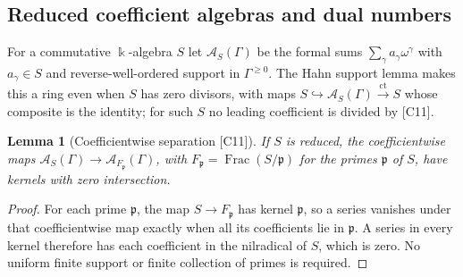 \documentclass[11pt,oneside]{article}
\numberwithin{equation}{section}
\newtheorem{lemma}[lemma]{Lemma}
\theoremstyle{definition}
\theoremstyle{remark}
\newcommand{\ct}{\operatorname{ct}}
\newcommand{\Frac}{\operatorname{Frac}}
\newcommand{\src}[1]{\textup{\textsf{\small[#1]}}}
\begin{document}
\subsection{Reduced coefficient algebras and dual numbers}\label{odg:cr:sub:reduced}

For a commutative $\Bbbk$-algebra $S$ let $\mathcal A_S(\Gamma)$ be the formal sums
$\sum_\gamma a_\gamma\omega^\gamma$ with $a_\gamma\in S$ and reverse-well-ordered support
in $\Gamma^{\ge0}$. The Hahn support lemma makes this a ring even when $S$ has zero
divisors, with maps $S\hookrightarrow\mathcal A_S(\Gamma)\xrightarrow{\ct}S$ whose
composite is the identity; for such $S$ no leading coefficient is divided by
\src{C11}.

\begin{lemma}[Coefficientwise separation \src{C11}]\label{odg:cr:lem:reducedinjective}
If $S$ is reduced, the coefficientwise maps
$\mathcal A_S(\Gamma)\to\mathcal A_{F_{\mathfrak p}}(\Gamma)$, with
$F_{\mathfrak p}=\Frac(S/\mathfrak p)$ for the primes $\mathfrak p$ of $S$, have kernels
with zero intersection.
\end{lemma}
\begin{proof}
For each prime $\mathfrak p$, the map $S\to F_{\mathfrak p}$ has kernel
$\mathfrak p$, so a series vanishes under that coefficientwise map exactly
when all its coefficients lie in $\mathfrak p$. A series in every kernel
therefore has each coefficient in the nilradical of $S$, which is zero.
No uniform finite support or finite collection of primes is required.
\end{proof}
\end{document}
